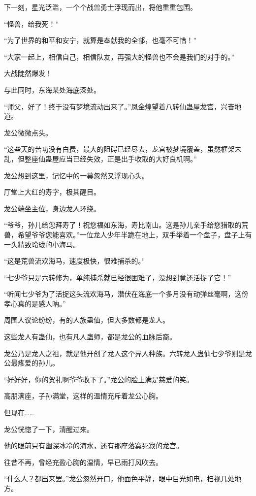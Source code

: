 \begin{this_body}
下一刻，星光泛滥，一个个战兽勇士浮现而出，将他重重包围。

“怪兽，给我死！”

“为了世界的和平和安宁，就算是奉献我的全部，也毫不可惜！”

“大家一起上，相信自己，相信队友，再强大的怪兽也不会是我们的对手的。”

大战陡然爆发！

与此同时，东海某处海底深处。

“师父，好了！终于没有梦境流动出来了。”凤金煌望着八转仙蛊屋龙宫，兴奋地道。

龙公微微点头。

“这些天的苦功没有白费，最大的阻碍已经尽去，龙宫被梦境覆盖，虽然框架未乱，但整座仙蛊屋应当已经失效，正是出手收取的大好良机啊。”

龙公想到这里，记忆中的一幕忽然又浮现心头。

厅堂上大红的寿字，极其醒目。

龙公端坐主位，身边龙人环绕。

“爷爷，孙儿给您拜寿了！祝您福如东海，寿比南山。这是孙儿亲手给您猎取的荒兽，希望爷爷您能喜欢。”一位龙人少年半跪在地上，双手举着一个盘子，盘子上有一头精致玲珑的小海马。

“这是荒兽流欢海马，速度极快，很难捕杀的。”

“七少爷只是六转修为，单纯捕杀就已经很困难了，没想到竟还活捉了它！”

“听闻七少爷为了活捉这头流欢海马，潜伏在海底一个多月没有动弹丝毫啊，这份孝心真的是感人呐。”

周围人议论纷纷，有的人族蛊仙，但大多数都是龙人。

这些龙人有蛊仙，也有凡人蛊师，都是龙公的血脉后裔。

龙公乃是龙人之祖，就是他开创了龙人这个异人种族。六转龙人蛊仙七少爷则是龙公最疼爱的孙儿。

“好好好，你的贺礼啊爷爷收下了。”龙公的脸上满是慈爱的笑。

高朋满座，子孙满堂，这样的温情充斥着龙公心胸。

但现在……

龙公恍惚了一下，清醒过来。

他的眼前只有幽深冰冷的海水，还有那座落寞死寂的龙宫。

往昔不再，曾经充盈心胸的温情，早已雨打风吹去。

“什么人？都出来罢。”龙公忽然开口，他面色平静，眼中目光如电，扫视几处地方。


\end{this_body}
